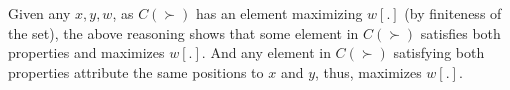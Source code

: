 \documentclass[12pt]{article}
\newcommand{\pref}{\succ}%
\begin{document}
Given any $x, y, w$, as $C(\pref)$ has an element maximizing $w[.]$ (by finiteness of the set), the above reasoning shows that some element in $C(\pref)$ satisfies both properties and maximizes $w[.]$. And any element in $C(\pref)$ satisfying both properties attribute the same positions to $x$ and $y$, thus, maximizes $w[.]$.
\end{document}
